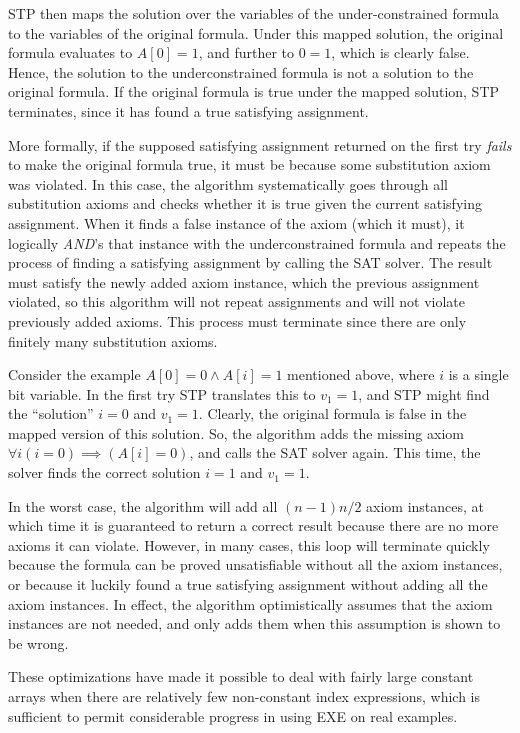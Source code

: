 \documentclass[11pt]{article}
\begin{document}
STP then maps the solution over the variables of the under-constrained
formula to the variables of the original formula. Under this mapped
solution, the original formula evaluates to $A[0] = 1$, and further to
$0=1$, which is clearly false. Hence, the solution to the
underconstrained formula is not a solution to the original formula.
If the original formula is true under the mapped solution, STP
terminates, since it has found a true satisfying assignment.

More formally, if the supposed satisfying assignment returned on the
first try {\em fails\/} to make the original formula true, it must be
because some substitution axiom was violated.  In this case, the
algorithm systematically goes through all substitution axioms and
checks whether it is true given the current satisfying assignment.
When it finds a false instance of the axiom (which it must), it
logically {\em AND}'s that instance with the underconstrained formula
and repeats the process of finding a satisfying assignment by calling
the SAT solver.  The result must satisfy the newly added axiom
instance, which the previous assignment violated, so this algorithm
will not repeat assignments and will not violate previously added
axioms. This process must terminate since there are only finitely many
substitution axioms.

Consider the example $A[0] = 0 \wedge A[i] = 1$ mentioned above, where
$i$ is a single bit variable. In the first try STP translates this to
$v_1 = 1$, and STP might find the ``solution'' $i = 0$ and $v_1 =
1$. Clearly, the original formula is false in the mapped version of
this solution. So, the algorithm adds the missing axiom $\forall i
(i=0) \implies (A[i]=0)$, and calls the SAT solver again. This time,
the solver finds the correct solution $i=1$ and $v_1=1$. 

In the worst case, the algorithm will add all $(n-1)n/2$ axiom
instances, at which time it is guaranteed to return a correct result
because there are no more axioms it can violate.  However, in many
cases, this loop will terminate quickly because the formula can be
proved unsatisfiable without all the axiom instances, or because it
luckily found a true satisfying assignment without adding all the
axiom instances.  In effect, the algorithm optimistically assumes that
the axiom instances are not needed, and only adds them when this
assumption is shown to be wrong.

These optimizations have made it possible to deal with fairly large
constant arrays when there are relatively few non-constant index expressions,
which is sufficient to permit considerable progress in using EXE on
real examples.  
\end{document}
